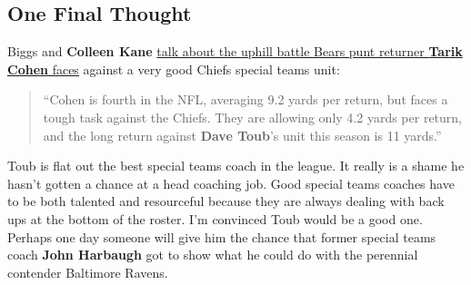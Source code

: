\documentclass[11pt]{article}
\begin{document}
\subsection{One Final Thought}

Biggs and \textbf{Colleen Kane} \href{https://www.chicagotribune.com/sports/bears/ct-cb-chicago-bears-allen-robinson-cordarrelle-patterson-20191219-aixloh5vi5auxfbrxpxfioulru-story.html}{talk about the uphill battle Bears punt returner \textbf{Tarik Cohen} faces} against a very good Chiefs special teams unit:

\begin{quote}
``Cohen is fourth in the NFL, averaging 9.2 yards per return, but faces a tough task against the Chiefs. They are allowing only 4.2 yards per return, and the long return against \textbf{Dave Toub}’s unit this season is 11 yards.''
\end{quote}

Toub is flat out the best special teams coach in the league.  It really is a shame he hasn't gotten a chance at a head coaching job.  Good special teams coaches have to be both talented and resourceful because they are always dealing with back ups at the bottom of the roster.  I'm convinced Toub would be a good one.  Perhaps one day someone will give him the chance that former special teams coach \textbf{John Harbaugh} got to show what he could do with the perennial contender Baltimore Ravens.
\end{document}
